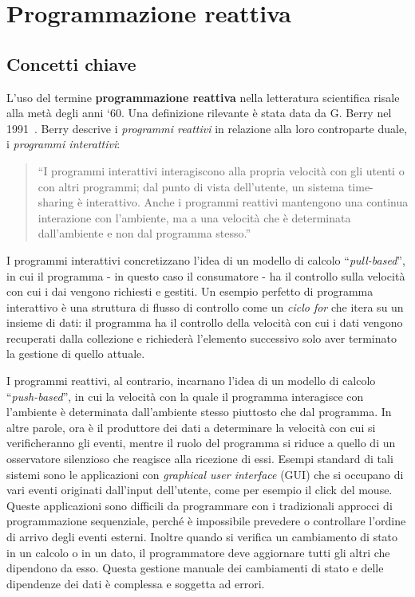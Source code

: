 \documentclass[12pt,a4paper,openright,twoside]{book}
\begin{document}
\chapter{Programmazione reattiva}
\section{Concetti chiave}
L'uso del termine \textbf{programmazione reattiva} nella letteratura scientifica risale alla metà degli anni `60. Una definizione rilevante è stata data da G. Berry nel 1991~\cite{DBLP:journals/pieee/BenvenisteB91}. Berry descrive i \textit{programmi reattivi} in relazione alla loro controparte duale, i \textit{programmi interattivi}: 
\begin{quotation}
    ``I programmi interattivi interagiscono alla propria velocità con gli utenti o con altri programmi; dal punto di vista dell'utente, un sistema time-sharing è interattivo. Anche i programmi reattivi mantengono una continua interazione con l'ambiente, ma a una velocità che è determinata dall'ambiente e non dal programma stesso.''
\end{quotation}
I programmi interattivi concretizzano l'idea di un modello di calcolo ``\textit{pull-based}'', in cui il programma - in questo caso il consumatore - ha il controllo sulla velocità con cui i dai vengono richiesti e gestiti. 
Un esempio perfetto di programma interattivo è una struttura di flusso di controllo come un \textit{ciclo for} che itera su un insieme di dati: il programma ha il controllo della velocità con cui i dati vengono recuperati dalla collezione e richiederà l'elemento successivo solo aver terminato la gestione di quello attuale. 

I programmi reattivi, al contrario, incarnano l'idea di un modello di calcolo ``\textit{push-based}'', in cui la velocità con la quale il programma interagisce con l'ambiente è determinata dall'ambiente stesso piuttosto che dal programma. In altre parole, ora è il produttore dei dati a determinare la velocità con cui si verificheranno gli eventi, mentre il ruolo del programma si riduce a quello di un osservatore silenzioso che reagisce alla ricezione di essi. Esempi standard di tali sistemi sono le applicazioni con \textit{graphical user interface} (GUI) che si occupano di vari eventi originati dall'input dell'utente, come per esempio il click del mouse. Queste applicazioni sono difficili da programmare con i tradizionali approcci di programmazione sequenziale, perché è impossibile prevedere o controllare l'ordine di arrivo degli eventi esterni. Inoltre quando si verifica un cambiamento di stato in un calcolo o in un dato, il programmatore deve aggiornare tutti gli altri che dipendono da esso. Questa gestione manuale dei cambiamenti di stato e delle dipendenze dei dati è complessa e soggetta ad errori.
\end{document}
